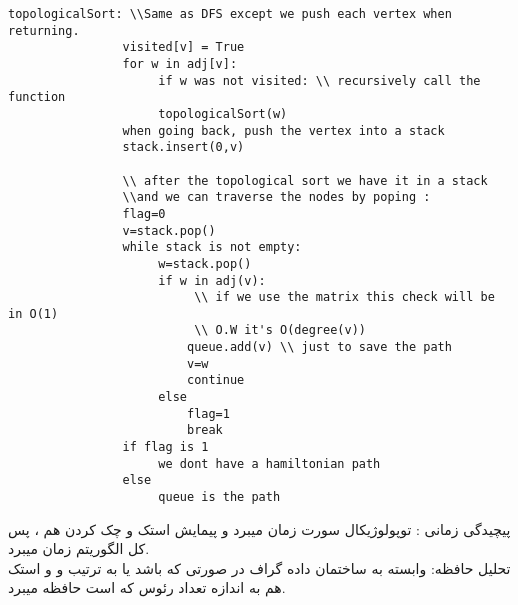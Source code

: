 \documentclass[11pt]{letter}
\begin{document}
			\begin{LTR}
				\begin{Verbatim}[tabsize=0]
				topologicalSort: \\Same as DFS except we push each vertex when returning.
				visited[v] = True
				for w in adj[v]: 
				     if w was not visited: \\ recursively call the function 
				     topologicalSort(w) 
				when going back, push the vertex into a stack
				stack.insert(0,v) 
				
				\\ after the topological sort we have it in a stack
				\\and we can traverse the nodes by poping :
				flag=0
				v=stack.pop()
				while stack is not empty:
				     w=stack.pop()
				     if w in adj(v):
				          \\ if we use the matrix this check will be in O(1)
				          \\ O.W it's O(degree(v))
				         queue.add(v) \\ just to save the path
				         v=w
				         continue
				     else 
				         flag=1
				         break
				if flag is 1
				     we dont have a hamiltonian path
				else
				     queue is the path
				\end{Verbatim}
			\end{LTR}
			پیچیدگی زمانی : 
			توپولوژیکال سورت 
			زمان میبرد و پیمایش استک 
						و چک کردن هم 
						، پس کل الگوریتم
									زمان میبرد.
									\\
									تحلیل حافظه:
									وابسته به ساختمان داده گراف 
									در صورتی که 
									باشد یا 
									به ترتیب 
												و 
															و استک هم به اندازه تعداد رئوس که 
															است حافظه میبرد.
\end{document}

